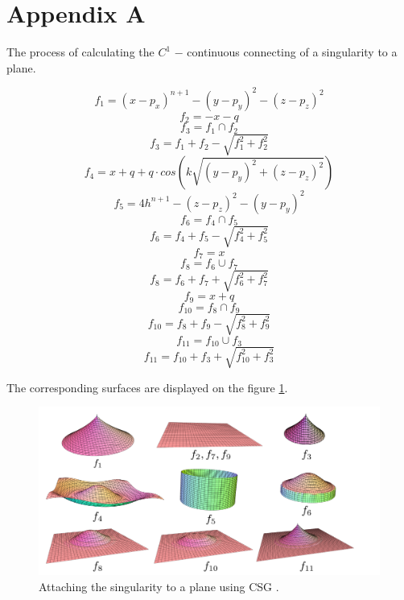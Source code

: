 \chapter*{Appendix A}
\label{appA}
The process of calculating the $C^1$ $-$ continuous connecting of a singularity to 
a plane.

$$f_1 = (x - p_x)^{n+1} - (y - p_y)^2 - (z - p_z)^2$$
$$f_2 = - x - q$$
$$f_3 = f_1 \cap f_2$$
$$f_3 = f_1+f_2-\sqrt{f_1^2+f_2^2}$$
$$f_4 = x + q + q \cdot cos\left(k \sqrt{(y - p_y)^2 + (z - p_z)^2}\right)$$
$$f_5 = 4 h^{n+1} - (z - p_z)^2 - (y - p_y)^2$$
$$f_6 = f_4 \cap f_5$$
$$f_6 = f_4+f_5-\sqrt{f_4^2+f_5^2}$$
$$f_7 = x$$
$$f_8 = f_6 \cup f_7$$
$$f_8 = f_6 + f_7 + \sqrt{f_6^2+f_7^2}$$
$$f_9 = x+q$$
$$f_{10} = f_8 \cap f_9$$
$$f_{10} = f_8 + f_9 - \sqrt{f_8^2+f_9^2}$$
$$f_{11} = f_{10} \cup f_3$$
$$f_{11} = f_{10} + f_3 + \sqrt{f_{10}^2+f_3^2}$$

The corresponding surfaces are displayed on the figure \ref{img:27}.

\begin{figure}
    \centerline{\includegraphics[scale=0.5]{images/img27}}
    \caption[Attaching the singularity to a plane using CSG]
    {Attaching the singularity to a plane using CSG \cite{calcplot3d}.}
    \label{img:27}
\end{figure}

